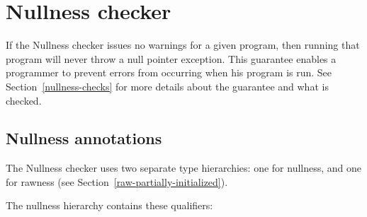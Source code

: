 \htmlhr
\section{Nullness checker\label{nullness-checker}}

If the Nullness checker issues no warnings for a given program, then
running that program will never throw a null pointer exception.  This
guarantee enables a programmer to prevent errors from occurring when his
program is run.  See Section~\ref{nullness-checks} for more details about
the guarantee and what is checked.


\subsection{Nullness annotations\label{nullness-annotations}}

The Nullness checker uses two separate type hierarchies:  one for nullness,
and one for rawness (see Section~\ref{raw-partially-initialized}).

The nullness hierarchy contains these qualifiers:

